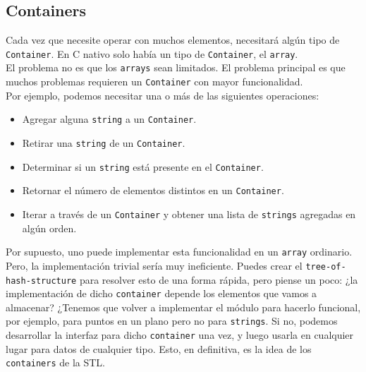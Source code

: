 \documentclass[a4paper,12pt]{article}
\begin{document}
\subsection*{Containers}
Cada vez que necesite operar con muchos elementos, necesitará algún tipo de \texttt{Container}. En C nativo solo había un tipo de \texttt{Container}, el \texttt{array}.\\
El problema no es que los \texttt{arrays} sean limitados. El problema principal es que muchos problemas requieren un \texttt{Container} con mayor funcionalidad.\\
Por ejemplo, podemos necesitar una o más de las siguientes operaciones:
\begin{itemize}
\item Agregar alguna \texttt{string} a un \texttt{Container}.
\item Retirar una \texttt{string} de un \texttt{Container}.
\item Determinar si un \texttt{string} está presente en el \texttt{Container}.
\item Retornar el número de elementos distintos en un \texttt{Container}.
\item Iterar a través de un \texttt{Container} y obtener una lista de \texttt{strings} agregadas en algún orden.
\end{itemize}
Por supuesto, uno puede implementar esta funcionalidad en un \texttt{array} ordinario. Pero, la implementación trivial sería muy ineficiente. Puedes crear el \texttt{tree-of-hash-structure} para resolver esto de una forma rápida, pero piense un poco: ¿la implementación de dicho \texttt{container} depende los elementos que vamos a almacenar? ¿Tenemos que volver a implementar el módulo para hacerlo funcional, por ejemplo, para puntos en un plano pero no para \texttt{strings}. Si no, podemos desarrollar la interfaz para dicho \texttt{container} una vez, y luego usarla en cualquier lugar para datos de cualquier tipo. Esto, en definitiva, es la idea de los \texttt{containers} de la STL.
\end{document}
